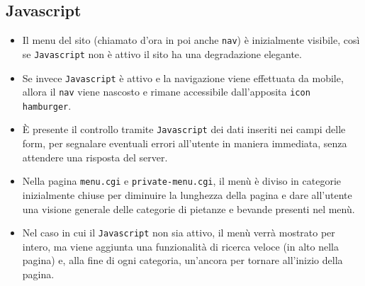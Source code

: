 \documentclass[../relazione.tex]{subfiles}
\begin{document}
	\subsection{Javascript}
	\begin{itemize}
		\item Il menu del sito (chiamato d'ora in poi anche \texttt{nav}) è inizialmente visibile, così se \texttt{Javascript} non è attivo il sito ha una degradazione elegante.
		\item Se invece \texttt{Javascript} è attivo e la navigazione viene effettuata da mobile, allora il \texttt{nav} viene nascosto e rimane accessibile dall'apposita \texttt{icon hamburger}.
		\item È presente il controllo tramite \texttt{Javascript} dei dati inseriti nei campi delle form, per segnalare eventuali errori all'utente in maniera immediata, senza attendere una risposta del server.
		\item Nella pagina \texttt{menu.cgi} e \texttt{private-menu.cgi}, il menù è diviso in categorie inizialmente chiuse per diminuire la lunghezza della pagina e dare all'utente una visione generale delle categorie di pietanze e bevande presenti nel menù.
		\item Nel caso in cui il \texttt{Javascript} non sia attivo, il menù verrà mostrato per intero, ma viene aggiunta una funzionalità di ricerca veloce (in alto nella pagina) e, alla fine di ogni categoria, un'ancora per tornare all'inizio della pagina.
	\end{itemize}
\end{document}
